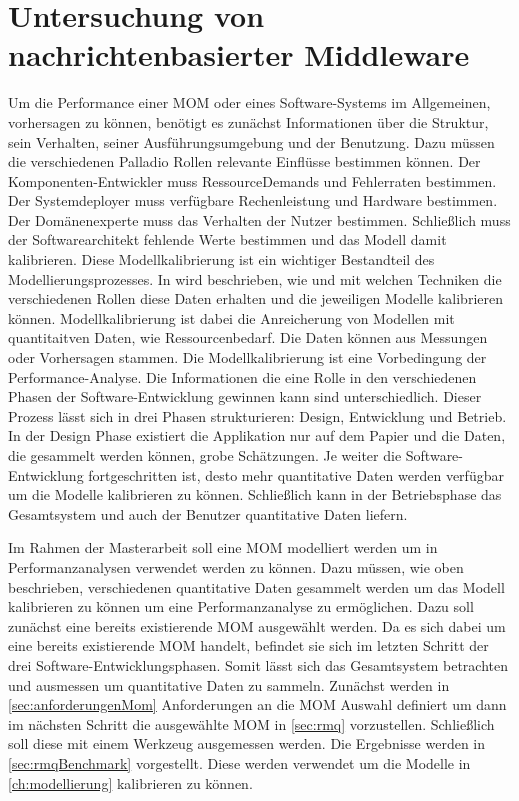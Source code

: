 

\chapter{Untersuchung von nachrichtenbasierter Middleware}
\label{ch:mom}
Um die Performance einer MOM oder eines Software-Systems im Allgemeinen, vorhersagen zu können, benötigt es zunächst Informationen über die Struktur, sein Verhalten, seiner Ausführungsumgebung und der Benutzung. Dazu müssen die verschiedenen Palladio Rollen relevante Einflüsse bestimmen können. Der Komponenten-Entwickler muss RessourceDemands und Fehlerraten bestimmen. Der Systemdeployer muss verfügbare Rechenleistung und Hardware bestimmen. Der Domänenexperte muss das Verhalten der Nutzer bestimmen. Schließlich muss der Softwarearchitekt fehlende Werte bestimmen und das Modell damit kalibrieren. Diese Modellkalibrierung ist ein wichtiger Bestandteil des Modellierungsprozesses. In \cite{palladio17} wird beschrieben, wie und mit welchen Techniken die verschiedenen Rollen diese Daten erhalten und die jeweiligen Modelle kalibrieren können. Modellkalibrierung ist dabei die Anreicherung von Modellen mit quantitaitven Daten, wie Ressourcenbedarf. Die Daten können aus Messungen oder Vorhersagen stammen. Die Modellkalibrierung ist eine Vorbedingung der Performance-Analyse. Die Informationen die eine Rolle in den verschiedenen Phasen der Software-Entwicklung gewinnen kann sind unterschiedlich. Dieser Prozess lässt sich in drei Phasen strukturieren: Design, Entwicklung und Betrieb. In der Design Phase existiert die Applikation nur auf dem Papier und die Daten, die gesammelt werden können, grobe Schätzungen. Je weiter die Software-Entwicklung fortgeschritten ist, desto mehr quantitative Daten werden verfügbar um die Modelle kalibrieren zu können. Schließlich kann in der Betriebsphase das Gesamtsystem und auch der Benutzer quantitative Daten liefern. 

Im Rahmen der Masterarbeit soll eine MOM modelliert werden um in Performanzanalysen verwendet werden zu können. Dazu müssen, wie oben beschrieben, verschiedenen quantitative Daten gesammelt werden um das Modell kalibrieren zu können um eine Performanzanalyse zu ermöglichen. Dazu soll zunächst eine bereits existierende MOM ausgewählt werden. Da es sich dabei um eine bereits existierende MOM handelt, befindet sie sich im letzten Schritt der drei Software-Entwicklungsphasen. Somit lässt sich das Gesamtsystem betrachten und ausmessen um quantitative Daten zu sammeln. Zunächst werden in \autoref{sec:anforderungenMom} Anforderungen an die MOM Auswahl definiert um dann im nächsten Schritt die ausgewählte MOM in \autoref{sec:rmq} vorzustellen. Schließlich soll diese mit einem Werkzeug ausgemessen werden. Die Ergebnisse werden in \autoref{sec:rmqBenchmark} vorgestellt. Diese werden verwendet um die Modelle in \autoref{ch:modellierung} kalibrieren zu können.


